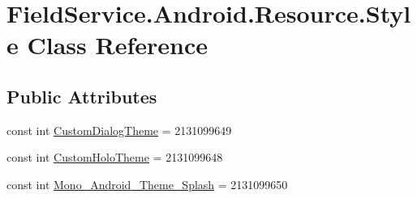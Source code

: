 \hypertarget{class_field_service_1_1_android_1_1_resource_1_1_style}{\section{Field\+Service.\+Android.\+Resource.\+Style Class Reference}
\label{class_field_service_1_1_android_1_1_resource_1_1_style}
}
\subsection*{Public Attributes}
\begin{DoxyCompactItemize}
\item 
const int \hyperlink{class_field_service_1_1_android_1_1_resource_1_1_style_a8ed455243f47bd73840e300741db381a}{Custom\+Dialog\+Theme} = 2131099649
\item 
const int \hyperlink{class_field_service_1_1_android_1_1_resource_1_1_style_a5269f996725bdb13cdf593536d44d1c8}{Custom\+Holo\+Theme} = 2131099648
\item 
const int \hyperlink{class_field_service_1_1_android_1_1_resource_1_1_style_a66234800aac2bbaf1d499ae029a484b4}{Mono\+\_\+\+Android\+\_\+\+Theme\+\_\+\+Splash} = 2131099650
\end{DoxyCompactItemize}


